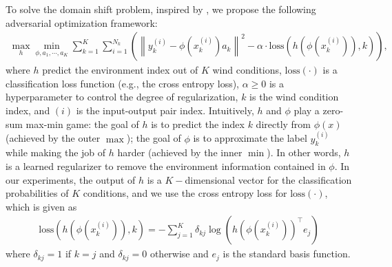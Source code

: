 To solve the domain shift problem, inspired by \cite{ganin2016domain}, we propose the following adversarial optimization framework:
\begin{equation}
\label{eq:optimization-both-loss}
\begin{aligned}
    \max_{h} \min_{\phi,a_1,\cdots,a_K}
    \sum_{k=1}^K\sum_{i=1}^{N_k}
    \left(
    \left\| y_k^{(i)} - \phi(x_k^{(i)})a_k \right\|^2 - \alpha\cdot\mathrm{loss}\left( h( \phi(x_k^{(i)}) ), k \right)
    \right),
\end{aligned}
\end{equation}
where $h$  predict the environment index out of $K$ wind conditions, $\mathrm{loss}(\cdot)$ is a classification loss function (e.g., the cross entropy loss), $\alpha\geq0$ is a hyperparameter to control the degree of regularization, $k$ is the wind condition index, and $(i)$ is the input-output pair index. Intuitively, $h$ and $\phi$ play a zero-sum max-min game: the goal of $h$ is to predict the index $k$ directly from $\phi(x)$ (achieved by the outer $\max$); the goal of $\phi$ is to approximate the label $y_k^{(i)}$ while making the job of $h$ harder (achieved by the inner $\min$). In other words, $h$ is a learned regularizer to remove the environment information contained in $\phi$. In our experiments, the output of $h$ is a $K-$dimensional vector for the classification probabilities of $K$ conditions, and we use the cross entropy loss for $\mathrm{loss}(\cdot)$, which is given as
\begin{align}
    \mathrm{loss}\left( h( \phi(x_k^{(i)}) ), k \right) = - \sum_{j=1}^K \delta_{k j} \log\left( h( \phi(x_k^{(i)}) )^\top e_j \right)
\end{align}
where $\delta_{kj}=1$ if $k=j$ and $\delta_{kj}=0$ otherwise and $e_j$ is the standard basis function.

